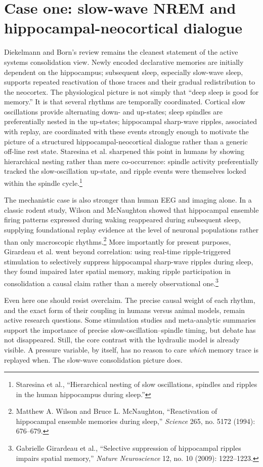 \documentclass[11pt]{article}
\begin{document}
\section{Case one: slow-wave NREM and hippocampal-neocortical dialogue}
Diekelmann and Born's review remains the cleanest statement of the active systems consolidation view. Newly encoded declarative memories are initially dependent on the hippocampus; subsequent sleep, especially slow-wave sleep, supports repeated reactivation of those traces and their gradual redistribution to the neocortex. The physiological picture is not simply that ``deep sleep is good for memory.'' It is that several rhythms are temporally coordinated. Cortical slow oscillations provide alternating down- and up-states; sleep spindles are preferentially nested in the up-states; hippocampal sharp-wave ripples, associated with replay, are coordinated with these events strongly enough to motivate the picture of a structured hippocampal-neocortical dialogue rather than a generic off-line rest state. Staresina et al. sharpened this point in humans by showing hierarchical nesting rather than mere co-occurrence: spindle activity preferentially tracked the slow-oscillation up-state, and ripple events were themselves locked within the spindle cycle.\footnote{Staresina et al., ``Hierarchical nesting of slow oscillations, spindles and ripples in the human hippocampus during sleep.''}

The mechanistic case is also stronger than human EEG and imaging alone. In a classic rodent study, Wilson and McNaughton showed that hippocampal ensemble firing patterns expressed during waking reappeared during subsequent sleep, supplying foundational replay evidence at the level of neuronal populations rather than only macroscopic rhythms.\footnote{Matthew A. Wilson and Bruce L. McNaughton, ``Reactivation of hippocampal ensemble memories during sleep,'' \emph{Science} 265, no. 5172 (1994): 676--679.} More importantly for present purposes, Girardeau et al. went beyond correlation: using real-time ripple-triggered stimulation to selectively suppress hippocampal sharp-wave ripples during sleep, they found impaired later spatial memory, making ripple participation in consolidation a causal claim rather than a merely observational one.\footnote{Gabrielle Girardeau et al., ``Selective suppression of hippocampal ripples impairs spatial memory,'' \emph{Nature Neuroscience} 12, no. 10 (2009): 1222--1223.}

Even here one should resist overclaim. The precise causal weight of each rhythm, and the exact form of their coupling in humans versus animal models, remain active research questions. Some stimulation studies and meta-analytic summaries support the importance of precise slow-oscillation--spindle timing, but debate has not disappeared. Still, the core contrast with the hydraulic model is already visible. A pressure variable, by itself, has no reason to care \emph{which} memory trace is replayed when. The slow-wave consolidation picture does.
\end{document}
